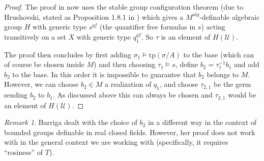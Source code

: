 \documentclass[12pt]{article}
\theoremstyle{definition}
\theoremstyle{mystyle}
\theoremstyle{remark}
\newtheorem{rem}[thm]{Remark}
\newcommand{\acl}{\mathrm{acl}}
\newcommand{\tp}{\mathrm{tp}}
\begin{document}
\begin{proof}
The proof in \cite{HrPi} now uses the stable group configuration
theorem (due to Hrushovski, stated as Proposition 1.8.1 in
\cite{HrPi}) which gives a $M^{alg}$-definable algebraic group $H$
with generic type $s^{qf}$ (the quantifier free formulas in $s$)
acting transitively on a set $X$ with generic type $q_1^{qf}$. So
$\tau$ is an element of $H(\mathcal U)$.

The proof then concludes by first adding $\sigma_1\models
\tp(\sigma/A)$ to the base (which can of course be chosen inside
$M$) and then choosing $\tau_1\models s$, define $b_2=\tau_1^{-1}
b_1$ and add $b_2$ to the base. In this order it is impossible to
guarantee that $b_2$ belongs to $M$. However, we can choose
$b_2\in M$ a realization of $q_1$, and choose $\tau_{2,1}$ be the
germ sending $b_2$ to $b_1$. As discussed above this can always be
chosen and $\tau_{2,1}$ would be an element of $H(\mathcal U)$.
\end{proof}

\begin{rem}
Barriga \cite{Ba} dealt with the choice of $b_2$ in a different
way in the context of bounded groups definable in real closed
fields. However, her proof does not work with in the general
context we are working with (specifically, it requires
``rosiness'' of $T$).
\end{rem}


\begin{comment}
We go through the proof to see that this can be arranged. The
elements $a,b,c$ in the proof were picked at the beginning and
never changed in the proof, so we only need to verify that all the
base extensions done during the construction can take place inside
$M$. But this holds since whenever a new point is introduced, it
is chosen independently (in the sense of dimension) from all the
points chosen so far, and we can always do that inside $M$. More
precisely, following the notations of the proof: in Lemma 3.2, we
first chose $x'$ in $G(M)$, then pick $z_1 \in G(M)$ and this
ensures that $A_2 \subseteq M$. The set $A$ after the proof of 3.2
is equal to $\acl(A_2)\cap F$ and is therefore in $M$. There are
only two base extensions left, done at the very end. We chose
$\sigma_1 \in M$ and have $A_1 = \acl(A,\sigma_1)\cap F\subseteq
M$ (it seems that there is a typo in the paper, it says $A_1 =
\acl(A,\sigma)\cap F$ instead). Finally, take $\tau_1$ such that
$b_2 := \tau_1^{-1} \cdot b_1$ is in $M$. This can be ensured for
example by choosing $b_2$ first. Then $A_2 \subseteq M$ and we are
done.
\end{comment}
\end{document}
